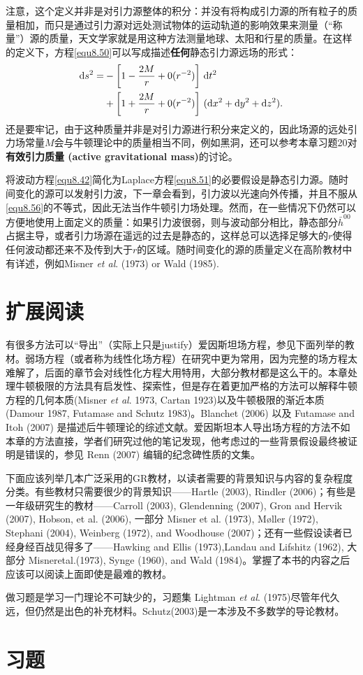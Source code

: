 注意，这个定义并非是对引力源整体的积分：并没有将构成引力源的所有粒子的质量相加，而只是通过引力源对远处测试物体的运动轨道的影响效果来测量（“称量”）源的质量，天文学家就是用这种方法测量地球、太阳和行星的质量。在这样的定义下，方程\eqref{equ8.50}可以写成描述\textbf{任何}静态引力源远场的形式：
\begin{align}
    \mathrm{d} s^2 = &- \left[ 1 - \frac{2M}{r} + 0(r^{-2}) \right] \, \mathrm{d} t^2 \notag \\
    & + \left[ 1 + \frac{2M}{r} + 0(r^{-2}) \right]\, (\mathrm{d} x^2 + \mathrm{d} y^2 + \mathrm{d} z^2). \label{equ8.60}
\end{align}
还是要牢记，由于这种质量并非是对引力源进行积分来定义的，因此场源的远处引力场常量$M$会与牛顿理论中的质量相当不同，例如黑洞，还可以参考本章习题20对\textbf{有效引力质量 (active gravitational mass)}的讨论。

将波动方程\eqref{equ8.42}简化为Laplace方程\eqref{equ8.51}的必要假设是静态引力源。随时间变化的源可以发射引力波，下一章会看到，引力波以光速向外传播，并且不服从\eqref{equ8.56}的不等式，因此无法当作牛顿引力场处理。然而，在一些情况下仍然可以方便地使用上面定义的质量：如果引力波很弱，则与波动部分相比，静态部分$\bar{h}^{00}$占据主导，或者引力场源在遥远的过去是静态的，这样总可以选择足够大的$r$使得任何波动都还来不及传到大于$r$的区域。随时间变化的源的质量定义在高阶教材中有详述，例如Misner \textit{et al}. (1973) or Wald (1985).


\section{扩展阅读}
\label{sec8.5}
有很多方法可以“导出”（实际上只是justify）爱因斯坦场方程，参见下面列举的教材。弱场方程（或者称为线性化场方程）在研究中更为常用，因为完整的场方程太难解了，后面的章节会对线性化方程大用特用，大部分教材都是这么干的。本章处理牛顿极限的方法具有启发性、探索性，但是存在着更加严格的方法可以解释牛顿方程的几何本质(Misner \textit{et al}. 1973, Cartan 1923)以及牛顿极限的渐近本质(Damour 1987, Futamase and Schutz 1983)。Blanchet (2006) 以及 Futamase and Itoh (2007) 是描述后牛顿理论的综述文献。爱因斯坦本人导出场方程的方法不如本章的方法直接，学者们研究过他的笔记发现，他考虑过的一些背景假设最终被证明是错误的，参见 Renn (2007) 编辑的纪念碑性质的文集。

下面应该列举几本广泛采用的GR教材，以读者需要的背景知识与内容的复杂程度分类。有些教材只需要很少的背景知识——Hartle (2003), Rindler (2006)；有些是一年级研究生的教材——Carroll (2003), Glendenning (2007), Gron and Hervik (2007), Hobson, et al. (2006), 一部分 Misner et al. (1973), Møller (1972), Stephani (2004), Weinberg (1972), and Woodhouse (2007)；还有一些假设读者已经身经百战见得多了——Hawking and Ellis (1973),Landau and Lifshitz (1962), 大部分 Misneretal.(1973), Synge (1960), and Wald (1984)。掌握了本书的内容之后应该可以阅读上面即使是最难的教材。

做习题是学习一门理论不可缺少的，习题集 Lightman \textit{et al}. (1975)尽管年代久远，但仍然是出色的补充材料。Schutz(2003)是一本涉及不多数学的导论教材。


\section{习题}
\label{sec8.6}